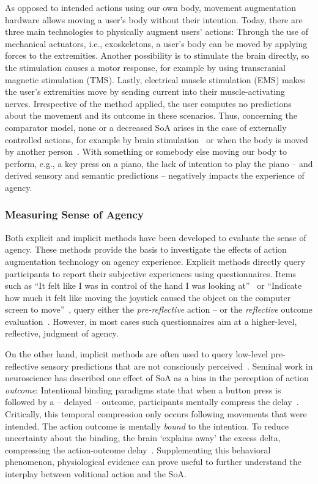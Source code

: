 As opposed to intended actions using our own body, movement augmentation hardware allows moving a user's body without their intention. Today, there are three main technologies to physically augment users' actions: Through the use of mechanical actuators, i.e., exoskeletons, a user's body can be moved by applying forces to the extremities. Another possibility is to stimulate the brain directly, so the stimulation causes a motor response, for example by using transcranial magnetic stimulation (TMS). Lastly, electrical muscle stimulation (EMS) makes the user's extremities move by sending current into their muscle-activating nerves. Irrespective of the method applied, the user computes no predictions about the movement and its outcome in these scenarios. Thus, concerning the comparator model, none or a decreased SoA arises in the case of externally controlled actions, for example by brain stimulation~\cite{Haggard2002-sz} or when the body is moved by another person~\cite{Kuhn2013-ls}. With something or somebody else moving our body to perform, e.g., a key press on a piano, the lack of intention to play the piano -- and derived sensory and semantic predictions -- negatively impacts the experience of agency. 

\subsubsection{Measuring Sense of Agency}
Both explicit and implicit methods have been developed to evaluate the sense of agency. These methods provide the basis to investigate the effects of action augmentation technology on agency experience. Explicit methods directly query participants to report their subjective experiences using questionnaires. Items such as ``It felt like I was in control of the hand I was looking at''~\cite{Haggard2002-sz} or ``Indicate how much it felt like moving the joystick caused the object on the computer screen to move''~\cite{Ebert2010-lu}, query either the \textit{pre-reflective} action -- or the \textit{reflective} outcome evaluation~\cite{Moore2012-dk}. However, in most cases such questionnaires aim at a higher-level, reflective, judgment of agency. 

On the other hand, implicit methods are often used to query low-level pre-reflective sensory predictions that are not consciously perceived~\cite{Moore2016-ub, Limerick2014-un, Moore2012-ic}. Seminal work in neuroscience has described one effect of SoA as a bias in the perception of action \textit{outcome}: Intentional binding paradigms state that when a button press is followed by a -- delayed -- outcome, participants mentally compress the delay~\cite{Haggard2002-sz}. Critically, this temporal compression only occurs following movements that were intended. The action outcome is mentally \textit{bound} to the intention. To reduce uncertainty about the binding, the brain `explains away' the excess delta, compressing the action-outcome delay~\cite{Barlas2018-bq}. Supplementing this behavioral phenomenon, physiological evidence can prove useful to further understand the interplay between volitional action and the SoA.

